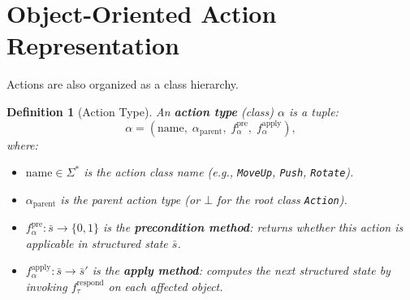 \documentclass{article}
\newtheorem{definition}{Definition}
\begin{document}

\section{Object-Oriented Action Representation}
\label{sec:oop_actions}

Actions are also organized as a class hierarchy.

\begin{definition}[Action Type]
\label{def:action_type}
An \textbf{action type} (class) $\alpha$ is a tuple:
\begin{equation}
\alpha = (\text{name}, \; \alpha_{\text{parent}}, \;
          f_\alpha^{\text{pre}}, \; f_\alpha^{\text{apply}}),
\end{equation}
where:
\begin{itemize}[nosep]
    \item $\text{name} \in \Sigma^*$ is the action class name
          (e.g., \texttt{MoveUp}, \texttt{Push}, \texttt{Rotate}).
    \item $\alpha_{\text{parent}}$ is the parent action type (or $\bot$ for
          the root class \texttt{Action}).
    \item $f_\alpha^{\text{pre}} : \bar{s} \to \{0, 1\}$ is the
          \textbf{precondition method}: returns whether this action is
          applicable in structured state $\bar{s}$.
    \item $f_\alpha^{\text{apply}} : \bar{s} \to \bar{s}'$ is the
          \textbf{apply method}: computes the next structured state by
          invoking $f_\tau^{\text{respond}}$ on each affected object.
\end{itemize}
\end{definition}
\end{document}
